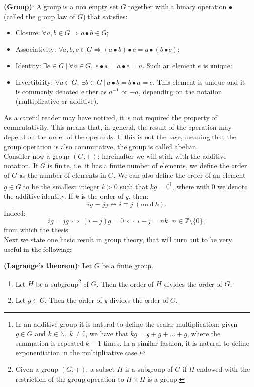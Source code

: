 \begin{mydef} {\bf (Group)}: A group is a non empty set $G$ together with a binary operation $\bullet$ (called the 	group law of $G$) that satisfies:
	\begin{itemize}
		\item Closure: $\forall a, b \in G  \Longrightarrow a \bullet b \in G$;
		\item Associativity: $\forall a, b, c \in G  \Longrightarrow (a \bullet b) \bullet c = a \bullet (b \bullet c)$;
		\item Identity: $\exists e \in G \ | \ \forall a \in G, \ e \bullet a = a \bullet e = a$. Such an element $e$ is unique; 
		\item Invertibility: $\forall a \in G, \ \exists b \in G \ | \ a \bullet b = b \bullet a = e$. This element is unique and it is commonly denoted either as $a^{-1}$ or $-a$, depending on the notation (multiplicative or additive).
	\end{itemize}
\end{mydef}
\label{def1}
As a careful reader may have noticed, it is not required the property of commutativity. This means that, in general, the result of the operation may depend on the order of the operands. If this is not the case, meaning that the group operation is also commutative, the group is called abelian.
\\
Consider now a group $(G, +)$: hereinafter we will stick with the additive notation.
If $G$ is finite, i.e. it has a finite number of elements, we define the order of $G$ as the number of elements in $G$. We can also define the order of an element $g \in G$ to be the smallest integer $k > 0$ such that $kg = 0$\footnote{In an additive group it is natural to define the scalar multiplication: given $g \in G$ and $k \in \mathbb{N}, \ k \neq 0$, we have that $kg = g + g + ... + g$, where the summation is repeated $k - 1$ times. In a similar fashion, it is natural to define exponentiation in the multiplicative case.}, where with 0 we denote the additive identity. If $k$ is the order of $g$, then:
$$ig = jg \Longleftrightarrow i \equiv j \ (\text{mod} \ k).$$
Indeed:
$$ig = jg \ \Longleftrightarrow \ (i - j)g = 0 \ \Longleftrightarrow \ i - j = nk, \ n \in \mathbb{Z}\text{\textbackslash}\{0\},$$
from which the thesis.
\\
Next we state one basic result in group theory, that will turn out to be very useful in the following:
\begin{thm} {\bf (Lagrange's theorem)}:
	Let $G$ be a finite group.
	\begin{enumerate}
		\item Let $H$ be a subgroup\footnote{Given a group $(G, +)$, a subset $H$ is a subgroup of $G$ if $H$ endowed with the restriction of the group operation to $H \times H$ is a group.} of $G$. Then the order of $H$ divides the order of $G$;
		\item Let $g \in G$. Then the order of $g$ divides the order of $G$.
	\end{enumerate}
\end{thm}

